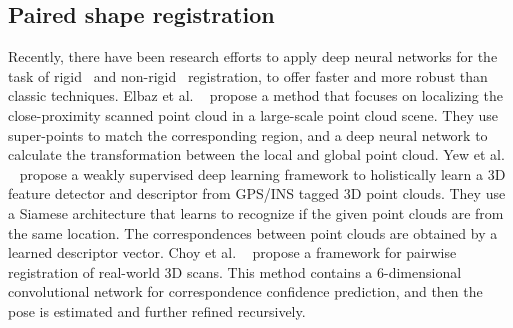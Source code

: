 \subsection{Paired shape registration} 
Recently, there have been research efforts to apply deep neural networks for the task of rigid~\cite{su2015render} and non-rigid~\cite{hanocka2018alignet, groueix2019unsupervised} registration, to offer faster and more robust than classic techniques.
Elbaz et al. ~ propose a method that focuses on localizing the close-proximity scanned point cloud in a large-scale point cloud scene. They use super-points to match the corresponding region, and a deep neural network to calculate the transformation between the local and global point cloud.
Yew et al. ~ propose a weakly supervised deep learning framework to holistically learn a 3D feature detector and descriptor from GPS/INS tagged 3D point clouds. They use a Siamese architecture that learns to recognize if the given point clouds are from the same location. The correspondences between point clouds are obtained by a learned descriptor vector.
Choy et al. ~ propose a framework for pairwise registration of real-world 3D scans. This method contains a 6-dimensional convolutional network for correspondence confidence prediction, and then the pose is estimated and further refined recursively.



